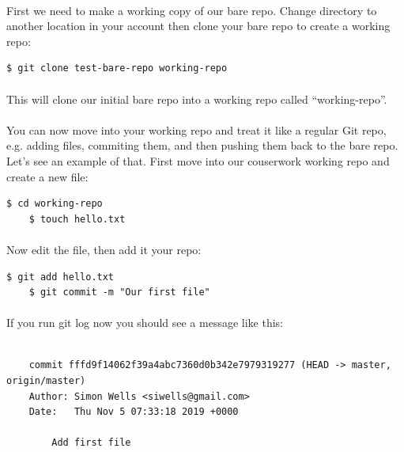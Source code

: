 \documentclass[12pt, a4paper, oneside]{book}
\begin{document}
\paragraph{} First we need to make a working copy of our bare repo. Change directory to another location in your account then clone your bare repo to create a working repo:

\begin{lstlisting}[style=DOS]
    $ git clone test-bare-repo working-repo
\end{lstlisting}

\paragraph{} This will clone our initial bare repo into a working repo called ``working-repo''.

\paragraph{} You can now move into your working repo and treat it like a regular Git repo, e.g. adding files, commiting them, and then pushing them back to the bare repo. Let's see an example of that. First move into our couserwork working repo and create a new file:

\begin{lstlisting}[style=DOS]
    $ cd working-repo
    $ touch hello.txt
\end{lstlisting}

\paragraph{} Now edit the file, then add it your repo:

\begin{lstlisting}[style=DOS]
    $ git add hello.txt
    $ git commit -m "Our first file"
\end{lstlisting}

\paragraph{} If you run git log now you should see a message like this:

\begin{lstlisting}[style=DOS]

    commit fffd9f14062f39a4abc7360d0b342e7979319277 (HEAD -> master, origin/master)
    Author: Simon Wells <siwells@gmail.com>
    Date:   Thu Nov 5 07:33:18 2019 +0000

        Add first file
\end{lstlisting}
\end{document}

